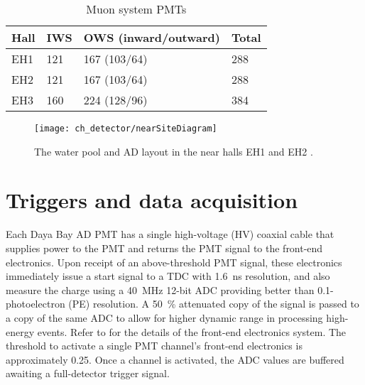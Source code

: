 \begin{table}[ht]
    \centering
    \begin{tabular}[t]{llll}
        \toprule
        Hall & IWS & OWS (inward/outward) & Total\\
        \midrule
        EH1 & 121 & 167 (103/64) & 288\\
        EH2 & 121 & 167 (103/64) & 288\\
        EH3 & 160 & 224 (128/96) & 384\\
        \bottomrule
    \end{tabular}
    \caption{Muon system PMTs \cite{muonsystem2015}}
    \label{tab:wp_pmts}
\end{table}

\begin{figure}
    \centering
    \texttt{[image: ch\_detector/nearSiteDiagram]}
    \caption{
        The water pool and AD layout in the near halls EH1 and EH2
        \cite{sidebyside}.
    }
    \label{fig:wpcutout}
\end{figure}



\section{Triggers and data acquisition}
\label{sec:daq}

Each Daya Bay AD PMT has a single high-voltage (HV) coaxial cable
that supplies power to the PMT and returns the PMT signal to the
front-end electronics.
Upon receipt of an above-threshold PMT signal, these electronics immediately
issue a start signal to a TDC with \SI{1.6}{\ns} resolution,
and also measure the charge using a \SI{40}{\MHz} \num{12}-bit ADC
providing better than \num{0.1}-photoelectron (PE) resolution.
A \SI{50}{\percent} attenuated copy of the signal is passed to a copy
of the same ADC to allow for higher dynamic range in processing high-energy
events.
Refer to \cite{sidebyside,ngd2016} for the details
of the front-end electronics system.
The threshold to activate a single PMT channel's front-end electronics
is approximately \SI{0.25}{\pe}.
Once a channel is activated, the ADC values are buffered
awaiting a full-detector trigger signal.

